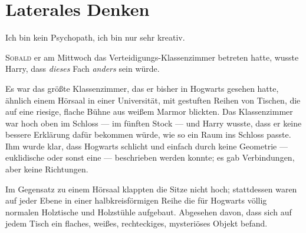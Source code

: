 \chapter{Laterales Denken}

\begin{chapterOpeningQuote}
Ich bin kein Psychopath, ich bin nur sehr kreativ.
\end{chapterOpeningQuote}

\lettrine{S}{obald} er am Mittwoch das Verteidigungs-Klassenzimmer betreten hatte, wusste Harry, dass \emph{dieses} Fach \emph{anders} sein würde.

Es war das größte Klassenzimmer, das er bisher in Hogwarts gesehen hatte, ähnlich einem Hörsaal in einer Universität, mit gestuften Reihen von Tischen, die auf eine riesige, flache Bühne aus weißem Marmor blickten. Das Klassenzimmer war hoch oben im Schloss — im fünften Stock — und Harry wusste, dass er keine bessere Erklärung dafür bekommen würde, wie so ein Raum ins Schloss passte. Ihm wurde klar, dass Hogwarts schlicht und einfach durch keine Geometrie — euklidische oder sonst eine — beschrieben werden konnte; es gab Verbindungen, aber keine Richtungen.

Im Gegensatz zu einem Hörsaal klappten die Sitze nicht hoch; stattdessen waren auf jeder Ebene in einer halbkreisförmigen Reihe die für Hogwarts völlig normalen Holztische und Holzstühle aufgebaut. Abgesehen davon, dass sich auf jedem Tisch ein flaches, weißes, rechteckiges, mysteriöses Objekt befand.

